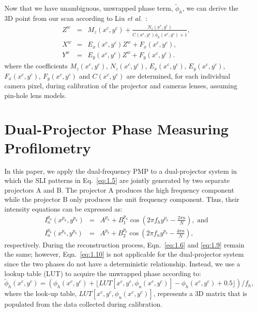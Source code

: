 \documentclass[]{spie}  %
\begin{document}
Now that we have unambiguous, unwrapped phase term, $\tilde{\phi}_h$, we can derive the 3D point from our scan according to Liu \textit{et al}.~\cite{liuk10}:
\begin{eqnarray}
Z^w & = & M_z(x^c, y^c) + \frac{N_z(x^c, y^c)}{C(x^c, y^c) \tilde{\phi}_h(x^c, y^c) + 1}, \label{eq:1.11} \\
X^w & = & E_x(x^c, y^c)Z^w + F_x(x^c, y^c), \label{eq:1.12} \\
Y^w & = & E_y(x^c, y^c)Z^w + F_y(x^c, y^c). \label{eq:1.13}
\end{eqnarray}
where the coefficients $M_z(x^c, y^c)$, $N_z(x^c, y^c)$, $E_x(x^c, y^c)$, $E_y(x^c, y^c)$, $F_x(x^c, y^c)$, $F_y(x^c, y^c)$ and $C(x^c, y^c)$ are determined, for each individual camera pixel, during calibration of the projector and cameras lenses, assuming pin-hole lens models.

\section{Dual-Projector Phase Measuring Profilometry}
In this paper, we apply the dual-frequency PMP to a dual-projector system in which the SLI patterns in Eq.~\eqref{eq:1.5} are jointly generated by two separate projectors A and B. The projector A produces the high frequency component while the projector B only produces the unit frequency component. Thus, their intensity equations can be expressed as:
\begin{eqnarray}
I^{p_a}_n(x^{p_a}, y^{p_a}) & = & A^{p_a} + B^{p_a}_1\cos\left(2\pi f_h y^{p_a} - \frac{2\pi n}{N}\right),\mbox{ and}\label{eq:1.14}\\
I^{p_b}_n(x^{p_b}, y^{p_b}) & = & A^{p_b} + B^{p_b}_2\cos\left(2\pi f_u y^{p_b} - \frac{4\pi n}{N}\right),\label{eq:1.15}
\end{eqnarray}
respectively. During the reconstruction process, Eqn.~\eqref{eq:1.6} and \eqref{eq:1.9} remain the same; however, Eqn.~\eqref{eq:1.10} is not applicable for the dual-projector system since the two phases do not have a deterministic relationship.  Instead, we use a lookup table (LUT) to acquire the unwrapped phase according to:
\begin{equation} \label{eq:1.16}
\tilde{\phi}_h(x^c, y^c) = \left( \phi_h(x^c, y^c) + \lfloor LUT[x^c, y^c, \phi_u(x^c, y^c)] - \phi_h(x^c, y^c) + 0.5 \rfloor \right)/f_h,
\end{equation}
where the look-up table, $LUT[x^c, y^c, \phi_u(x^c, y^c)]$, represents a 3D matrix that is populated from the data collected during calibration.
\end{document}
